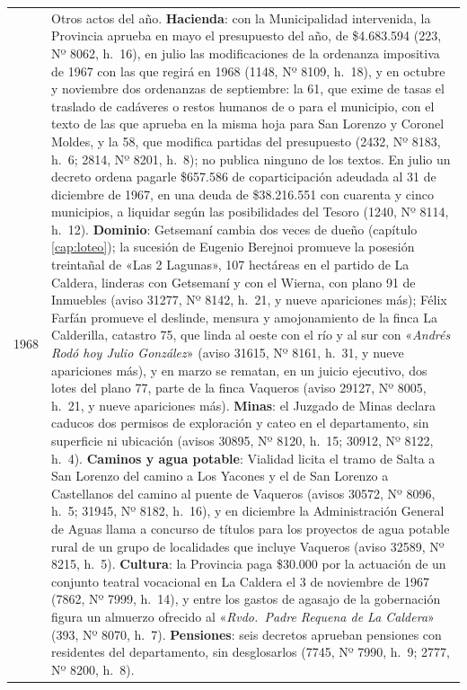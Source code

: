 \begin{longtable}{@{}p{2.7cm}p{10.3cm}@{}}
1968 & Otros actos del año. \textbf{Hacienda}: con la Municipalidad intervenida, la Provincia aprueba en mayo el presupuesto del año, de \$4.683.594 (223, Nº 8062, h.\ 16), en julio las modificaciones de la ordenanza impositiva de 1967 con las que regirá en 1968 (1148, Nº 8109, h.\ 18), y en octubre y noviembre dos ordenanzas de septiembre: la 61, que exime de tasas el traslado de cadáveres o restos humanos de o para el municipio, con el texto de las que aprueba en la misma hoja para San Lorenzo y Coronel Moldes, y la 58, que modifica partidas del presupuesto (2432, Nº 8183, h.\ 6; 2814, Nº 8201, h.\ 8); no publica ninguno de los textos. En julio un decreto ordena pagarle \$657.586 de coparticipación adeudada al 31 de diciembre de 1967, en una deuda de \$38.216.551 con cuarenta y cinco municipios, a liquidar según las posibilidades del Tesoro (1240, Nº 8114, h.\ 12). \textbf{Dominio}: Getsemaní cambia dos veces de dueño (capítulo \ref{cap:loteo}); la sucesión de Eugenio Berejnoi promueve la posesión treintañal de «Las 2 Lagunas», 107 hectáreas en el partido de La Caldera, linderas con Getsemaní y con el Wierna, con plano 91 de Inmuebles (aviso 31277, Nº 8142, h.\ 21, y nueve apariciones más); Félix Farfán promueve el deslinde, mensura y amojonamiento de la finca La Calderilla, catastro 75, que linda al oeste con el río y al sur con «\textit{Andrés Rodó hoy Julio González}» (aviso 31615, Nº 8161, h.\ 31, y nueve apariciones más), y en marzo se rematan, en un juicio ejecutivo, dos lotes del plano 77, parte de la finca Vaqueros (aviso 29127, Nº 8005, h.\ 21, y nueve apariciones más). \textbf{Minas}: el Juzgado de Minas declara caducos dos permisos de exploración y cateo en el departamento, sin superficie ni ubicación (avisos 30895, Nº 8120, h.\ 15; 30912, Nº 8122, h.\ 4). \textbf{Caminos y agua potable}: Vialidad licita el tramo de Salta a San Lorenzo del camino a Los Yacones y el de San Lorenzo a Castellanos del camino al puente de Vaqueros (avisos 30572, Nº 8096, h.\ 5; 31945, Nº 8182, h.\ 16), y en diciembre la Administración General de Aguas llama a concurso de títulos para los proyectos de agua potable rural de un grupo de localidades que incluye Vaqueros (aviso 32589, Nº 8215, h.\ 5). \textbf{Cultura}: la Provincia paga \$30.000 por la actuación de un conjunto teatral vocacional en La Caldera el 3 de noviembre de 1967 (7862, Nº 7999, h.\ 14), y entre los gastos de agasajo de la gobernación figura un almuerzo ofrecido al «\textit{Rvdo.\ Padre Requena de La Caldera}» (393, Nº 8070, h.\ 7). \textbf{Pensiones}: seis decretos aprueban pensiones con residentes del departamento, sin desglosarlos (7745, Nº 7990, h.\ 9; 2777, Nº 8200, h.\ 8). \\

\end{longtable}
